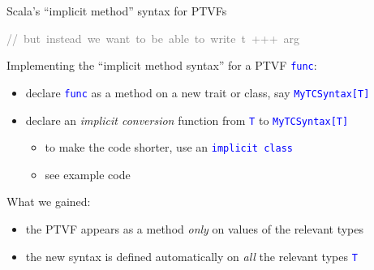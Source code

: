 \documentclass[english]{beamer}
\newenvironment{lyxcode}
   {\par\begin{list}{}{
     \setlength{\rightmargin}{\leftmargin}
     \setlength{\listparindent}{0pt}%
     \raggedright
     \setlength{\itemsep}{0pt}
     \setlength{\parsep}{0pt}
     \normalfont\ttfamily}%
    \def\{{\char`\{}
    \def\}{\char`\}}
    \def\textasciitilde{\char`\~}
    \item[]}
   {\end{list}}
\begin{document}
\begin{frame}{Scala's ``implicit method'' syntax for PTVFs}
\begin{lyxcode}
\textrm{\textcolor{gray}{\footnotesize{}//~but~instead~we~want~to~be~able~to~write~}}\textcolor{gray}{\footnotesize{}t~+++~arg}{\footnotesize \par}
\end{lyxcode}
Implementing the ``implicit method syntax'' for a PTVF \texttt{\textcolor{blue}{\footnotesize{}func}}:
\begin{itemize}
\item declare \texttt{\textcolor{blue}{\footnotesize{}func}} as a method
on a new trait or class, say \texttt{\textcolor{blue}{\footnotesize{}MyTCSyntax{[}T{]}}}{\footnotesize \par}
\item declare an \emph{implicit conversion }function from \texttt{\textcolor{blue}{\footnotesize{}T}}
to \texttt{\textcolor{blue}{\footnotesize{}MyTCSyntax{[}T{]}}}{\footnotesize \par}
\begin{itemize}
\item to make the code shorter, use an \texttt{\textcolor{blue}{\footnotesize{}implicit
class}}{\footnotesize \par}
\item see example code
\end{itemize}
\end{itemize}
What we gained:
\begin{itemize}
\item the PTVF appears as a method \emph{only} on values of the relevant
types
\item the new syntax is defined automatically on \emph{all} the relevant
types \texttt{\textcolor{blue}{\footnotesize{}T}}{\footnotesize \par}
\end{itemize}
\end{frame}
\end{document}
